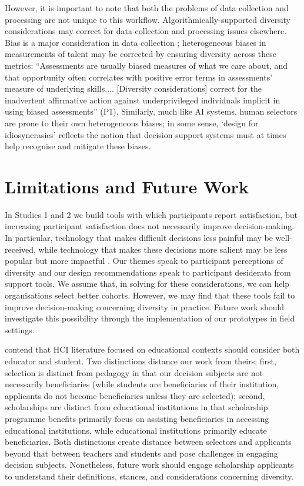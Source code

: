 However, it is important to note that both the problems of data collection and processing are not unique to this workflow. Algorithmically-supported diversity considerations may correct for data collection and processing issues elsewhere. Bias is a major consideration in data collection \cite{Friedler_Scheidegger_Venkatasubramanian_2016}; heterogeneous biases in measurements of talent may be corrected by ensuring diversity across these metrics: ``Assessments are usually biased measures of what we care about, and that opportunity often correlates with positive error terms in assessments' measure of underlying skills.... [Diversity considerations] correct for the inadvertent affirmative action against underprivileged individuals implicit in using biased assessments'' (P1). Similarly, much like AI systems, human selectors are prone to their own heterogeneous biases; in some sense, `design for idiosyncrasies' reflects the notion that decision support systems must at times help recognise and mitigate these biases.

\section{Limitations and Future Work}
In Studies 1 and 2 we build tools with which participants report satisfaction, but increasing participant satisfaction does not necessarily improve decision-making. In particular, technology that makes difficult decisions less painful may be well-received, while technology that makes these decisions more salient may be less popular but more impactful \cite{Lipton,miller_explainable_2023}. Our themes speak to participant perceptions of diversity and our design recommendations speak to participant desiderata from support tools. We assume that, in solving for these considerations, we can help organisations select better cohorts. However, we may find that these tools fail to improve decision-making concerning diversity in practice. Future work should investigate this possibility through the implementation of our prototypes in field settings.

\textcite{venn-wycherley_realities_2024} contend that HCI literature focused on educational contexts should consider both educator and student. Two distinctions distance our work from theirs: first, selection is distinct from pedagogy in that our decision subjects are not necessarily beneficiaries (while students are beneficiaries of their institution, applicants do not become beneficiaries unless they are selected); second, scholarships are distinct from educational institutions in that scholarship programme benefits primarily focus on assisting beneficiaries in accessing educational institutions, while educational institutions primarily educate beneficiaries. Both distinctions create distance between selectors and applicants beyond that between teachers and students and pose challenges in engaging decision subjects. Nonetheless, future work should engage scholarship applicants to understand their definitions, stances, and considerations concerning diversity. 

